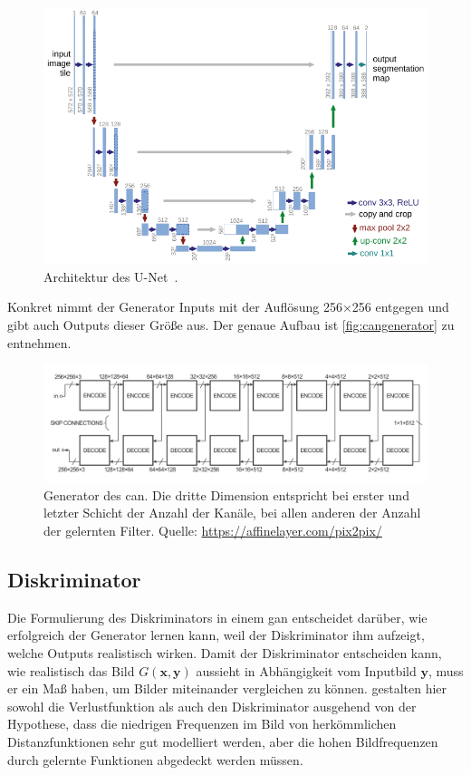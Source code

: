 \begin{figure}
	\centering
	\includegraphics[width=0.9\linewidth]{img/unet_architecture}
	\caption{Architektur des U-Net~\cite{Ronneberger.2015}.}
	\label{fig:unetarchitecture}
\end{figure}

Konkret nimmt der Generator Inputs mit der Auflösung 256$\times$256 entgegen und gibt auch Outputs dieser Größe aus.
Der genaue Aufbau ist \autoref{fig:cangenerator} zu entnehmen.

\begin{figure}
	\centering
	\includegraphics[width=0.9\linewidth]{img/can_generator}
	\caption[Generator des \gls{can}.]{Generator des \gls{can}. Die dritte Dimension entspricht bei erster und letzter Schicht der Anzahl der Kanäle, bei allen anderen der Anzahl der gelernten Filter. Quelle: \url{https://affinelayer.com/pix2pix/}}
	\label{fig:cangenerator}
\end{figure}



\subsection{Diskriminator}

Die Formulierung des Diskriminators in einem \gls{gan} entscheidet darüber, wie erfolgreich der Generator lernen kann, weil der Diskriminator ihm aufzeigt, welche Outputs realistisch wirken.
Damit der Diskriminator entscheiden kann, wie realistisch das Bild $ G(\mathbf{x}, \mathbf{y}) $ aussieht in Abhängigkeit vom Inputbild $ \mathbf{y} $, muss er ein Maß haben, um Bilder miteinander vergleichen zu können.
\citeauthor{Isola.2017} gestalten hier sowohl die Verlustfunktion als auch den Diskriminator ausgehend von der Hypothese, dass die niedrigen Frequenzen im Bild von herkömmlichen Distanzfunktionen sehr gut modelliert werden, aber die hohen Bildfrequenzen durch gelernte Funktionen abgedeckt werden müssen.

